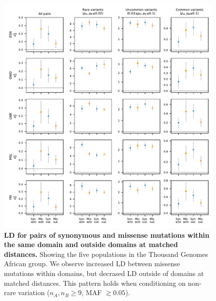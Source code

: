 \documentclass[]{article}
\begin{document}
\begin{figure}[ht!]
    \centering
    \includegraphics{../figures/data_domains_afr}
    \caption{
        \textbf{LD for pairs of synonymous and missense mutations within the
        same domain and outside domains at matched distances.}
        Showing the five populations in the Thousand Genomes African group.
        We observe increased LD between missense mutations within domains,
        but decrased LD outside of domains at matched distances. This pattern
        holds when conditioning on non-rare variation (\(n_A, n_B \geq 9\),
        MAF \(\gtrsim 0.05\)).
    }
    \label{fig:domainsAFR}
\end{figure}
\end{document}
